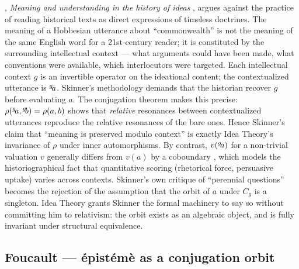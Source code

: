 \begin{zooentry*}
, \emph{Meaning and understanding in the
history of ideas} \cite{Skinner1969}, argues against the practice of
reading historical texts as direct expressions of timeless doctrines.
The meaning of a Hobbesian utterance about ``commonwealth'' is not
the meaning of the same English word for a 21st-century reader; it is
constituted by the surrounding intellectual context --- what
arguments could have been made, what conventions were available,
which interlocutors were targeted.
\formalclaim Each intellectual context $g$ is an invertible operator
on the ideational content; the contextualized utterance is
${}^{g}\!a$. Skinner's methodology demands that the historian
recover $g$ before evaluating $a$.
\formalstatus
The conjugation theorem makes this precise: $\rho({}^{g}\!a,
{}^{g}\!b) = \rho(a,b)$ shows that \emph{relative} resonances
between contextualized utterances reproduce the relative resonances
of the bare ones. Hence Skinner's claim that ``meaning is preserved
modulo context'' is exactly Idea Theory's invariance of $\rho$ under
inner automorphisms. By contrast, $v({}^{g}\!a)$ for a non-trivial
valuation $v$ generally differs from $v(a)$ by a coboundary
\cite{Brown1982}, which models the historiographical fact that
quantitative scoring (rhetorical force, persuasive uptake) varies
across contexts.
\litcomment
Skinner's own critique of ``perennial questions'' \cite{Skinner1969}
becomes the rejection of the assumption that the orbit of $a$ under
$C_g$ is a singleton. Idea Theory grants Skinner the formal
machinery to say so without committing him to relativism: the orbit
exists as an algebraic object, and is fully invariant under
structural equivalence.
\end{zooentry*}

\subsection{Foucault --- épistémè as a conjugation orbit}\label{zoo:foucault}

